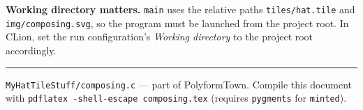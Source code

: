 \documentclass[10pt,a4paper]{article}
\newcommand{\code}[1]{\texttt{\small #1}}
\newcommand{\file}[1]{\texttt{\footnotesize #1}}
\begin{document}
\medskip
\noindent\textbf{Working directory matters.}  \code{main} uses the relative
paths \file{tiles/hat.tile} and \file{img/composing.svg}, so the program
must be launched from the project root.  In CLion, set the run
configuration's \emph{Working directory} to the project root accordingly.

\vspace{4pt}
\noindent\rule{\linewidth}{0.6pt}
\vspace{2pt}

{\small\color{gray}
\file{MyHatTileStuff/composing.c} — part of PolyformTown.
Compile this document with \texttt{pdflatex -shell-escape composing.tex}
(requires \texttt{pygments} for \texttt{minted}).
}
\end{document}
